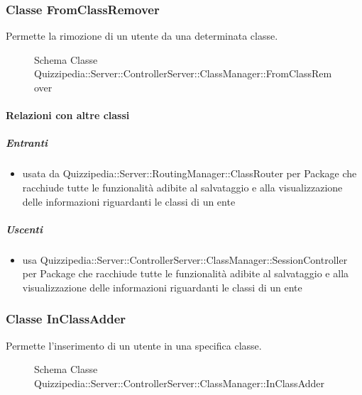 \subsubsection{Classe FromClassRemover}
Permette la rimozione di un utente da una determinata classe.
\begin{figure}[H]
\centering
\noindent{}
\caption[Schema Classe FromClassRemover]{Schema Classe Quizzipedia::Server::ControllerServer::ClassManager::FromClassRemover}
\end{figure}
\paragraph{Relazioni con altre classi}
\subparagraph{Entranti}
\begin{itemize}
\item usata da Quizzipedia::Server::RoutingManager::ClassRouter per Package che racchiude tutte le funzionalità adibite al salvataggio e alla visualizzazione delle informazioni riguardanti le classi di un ente
\end{itemize}
\subparagraph{Uscenti}
\begin{itemize}
\item usa Quizzipedia::Server::ControllerServer::ClassManager::SessionController per Package che racchiude tutte le funzionalità adibite al salvataggio e alla visualizzazione delle informazioni riguardanti le classi di un ente
\end{itemize}
\subsubsection{Classe InClassAdder}
Permette l'inserimento di un utente in una specifica classe.
\begin{figure}[H]
\centering
\noindent{}
\caption[Schema Classe InClassAdder]{Schema Classe Quizzipedia::Server::ControllerServer::ClassManager::InClassAdder}
\end{figure}
